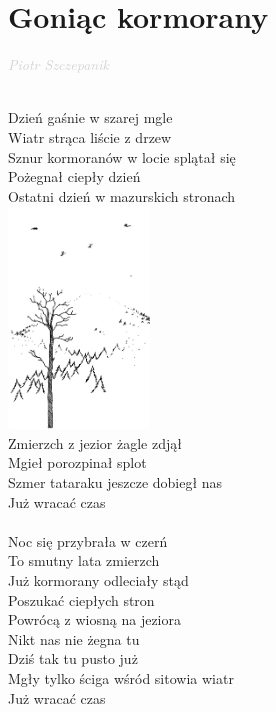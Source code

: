 \documentclass[a5paper, 10pt]{book}
\begin{document}
\section{Goniąc kormorany}\textcolor{lightgray}{\textit{Piotr Szczepanik}}\\~\\
\begin{minipage}[t]{0.7\textwidth}
Dzień gaśnie w szarej mgle\\
Wiatr strąca liście z drzew\\
Sznur kormoranów w locie splątał się\\
Pożegnał ciepły dzień\\
Ostatni dzień w mazurskich stronach\\
\includegraphics[height=59mm,right]{images/goniac_kormorany.png}\vspace*{-59mm}\\
\hspace*{5mm}Zmierzch z jezior żagle zdjął\\
\hspace*{5mm}Mgieł porozpinał splot\\
\hspace*{5mm}Szmer tataraku jeszcze dobiegł nas\\
\hspace*{5mm}Już wracać czas\\
\\
Noc się przybrała w czerń\\
To smutny lata zmierzch\\
Już kormorany odleciały stąd\\
Poszukać ciepłych stron\\
Powrócą z wiosną na jeziora\\
\hspace*{5mm}Nikt nas nie żegna tu\\
\hspace*{5mm}Dziś tak tu pusto już\\
\hspace*{5mm}Mgły tylko ściga wśród sitowia wiatr\\
\hspace*{5mm}Już wracać czas\\
\end{minipage}
\end{document}

